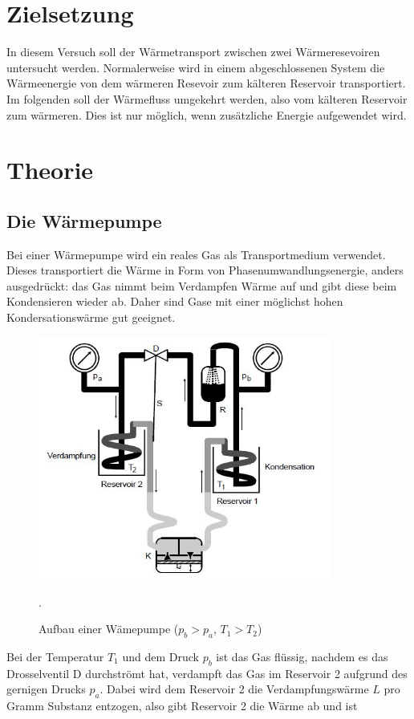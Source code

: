 
\section{Zielsetzung}
In diesem Versuch soll der Wärmetransport zwischen zwei Wärmeresevoiren untersucht werden.
Normalerweise wird in einem abgeschlossenen System die Wärmeenergie von dem wärmeren Resevoir zum
kälteren Reservoir transportiert. Im folgenden soll der Wärmefluss umgekehrt werden, also vom
kälteren Reservoir zum wärmeren. Dies ist nur möglich, wenn zusätzliche Energie
aufgewendet wird.

\section{Theorie}
\subsection{Die Wärmepumpe}
Bei einer Wärmepumpe wird ein reales Gas als Transportmedium verwendet. Dieses transportiert die
Wärme in Form von Phasenumwandlungsenergie, anders ausgedrückt: das Gas nimmt beim
Verdampfen Wärme auf und gibt diese beim Kondensieren wieder ab.
Daher sind Gase mit einer möglichst hohen Kondersationswärme gut geeignet.
\begin{figure}[H]
  \centering
  \includegraphics[height=8cm]{Pumpe.JPG}
  \caption{Aufbau einer Wämepumpe ($p_{b}>p_{a}$, $T_{1}>T_{2}$)}
  \cite{skript}.
  \label{fig:pumpe}
\end{figure}
Bei der Temperatur $T_{1}$ und dem Druck $p_{b}$ ist das Gas flüssig, nachdem es das Drosselventil D durchströmt
hat, verdampft das Gas im Reservoir 2 aufgrund des gernigen Drucks $p_{a}$. Dabei wird dem
Reservoir 2 die Verdampfungswärme $L$ pro Gramm Substanz entzogen, also gibt Reservoir 2 die Wärme ab und ist

